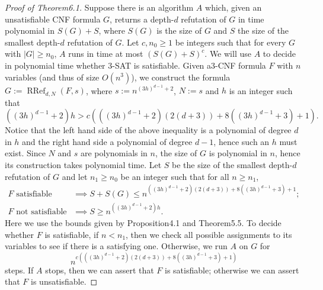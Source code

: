 \documentclass[10pt,a4paper]{article}
\newcommand{\RRef}{\operatorname{RRef}}
\begin{document}
\begin{proof}[Proof of Theorem6.1]
Suppose there is an algorithm $A$ which, given an unsatisfiable CNF formula $G$, returns a depth-$d$ refutation of $G$ in time polynomial in $S(G)+S$, where $S(G)$ is the size of $G$ and $S$ the size of the smallest depth-$d$ refutation of $G$. Let $c,n_0\ge1$ be integers such that for every $G$ with $|G|\ge n_0$, $A$ runs in time at most $(S(G)+S)^c$. We will use $A$ to decide in polynomial time whether 3-SAT is satisfiable. Given a3-CNF formula $F$ with $n$ variables (and thus of size $O(n^3)$), we construct the formula $G:=\RRef_{d,N}(F,s)$, where $s:=n^{(3h)^{d-1}+2}$, $N:=s$ and $h$ is an integer such that
\[((3h)^{d-1}+2)h>c\left(((3h)^{d-1}+2)(2(d+3))+8((3h)^{d-1}+3)+1\right).\]
Notice that the left hand side of the above inequality is a polynomial of degree $d$ in $h$ and the right hand side a polynomial of degree $d-1$, hence such an $h$ must exist. Since $N$ and $s$ are polynomials in $n$, the size of $G$ is polynomial in $n$, hence its construction takes polynomial time. Let $S$ be the size of the smallest depth-$d$ refutation of $G$ and let $n_1\ge n_0$ be an integer such that for all $n\ge n_1$,
\begin{align*}
F\text{ satisfiable}&\implies S+S(G)\le n^{((3h)^{d-1}+2)(2(d+3))+8((3h)^{d-1}+3)+1};\\
F\text{ not satisfiable}&\implies S\ge n^{((3h)^{d-1}+2)h}.
\end{align*}
Here we use the bounds given by Proposition4.1 and Theorem5.5. To decide whether $F$ is satisfiable, if $n<n_1$, then we check all possible assignments to its variables to see if there is a satisfying one. Otherwise, we run $A$ on $G$ for
\[n^{c(((3h)^{d-1}+2)(2(d+3))+8((3h)^{d-1}+3)+1)}\]
steps. If $A$ stops, then we can assert that $F$ is satisfiable; otherwise we can assert that $F$ is unsatisfiable.
\end{proof}
\end{document}
